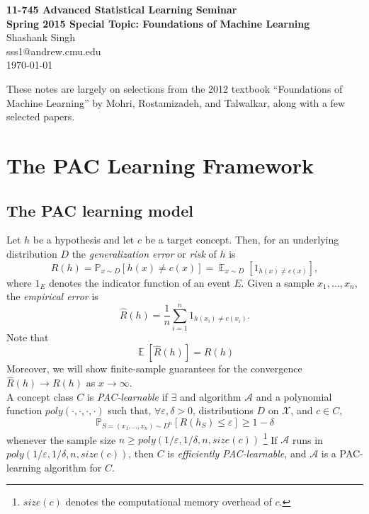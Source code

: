 \documentclass[10pt]{article}
\newcommand{\e}{\varepsilon}                        %
\newcommand{\X}{\mathcal{X}}                        %
\newcommand{\A}{\mathcal{A}}                        %
\newcommand{\E}{\mathop{\mathbb{E}}}                %
\newcommand{\pr}{\mathbb{P}}                        %
\renewcommand{\hat}{\widehat}
\begin{document}
\begin{center}
{\bf\Large 11-745 Advanced Statistical Learning Seminar\\
Spring 2015 Special Topic: Foundations of Machine Learning}\\
Shashank Singh\\
sss1@andrew.cmu.edu\\
\today\\
\end{center}



These notes are largely on selections from the 2012 textbook ``Foundations of
Machine Learning'' by Mohri, Rostamizadeh, and Talwalkar, along with a few
selected papers.\\

\section{The PAC Learning Framework}
\subsection{The PAC learning model}
Let $h$ be a hypothesis and let $c$ be a target concept. Then, for an
underlying distribution $D$ the \emph{generalization error} or \emph{risk} of
$h$ is
\[R(h)
    = \pr_{x \sim D}\left[ h(x) \neq c(x) \right]
    = \E_{x \sim D}\left[ 1_{h(x) \neq c(x)} \right],\]
where $1_E$ denotes the indicator function of an event $E$.
Given a sample $x_1,\dots,x_n$, the \emph{empirical error} is
\[\hat R(h) = \frac1n \sum_{i = 1}^n 1_{h(x_i) \neq c(x_i)}.\]
Note that
\begin{equation}
\E[\hat R(h)] = R(h)
\label{eq:exp_emp_risk}
\end{equation}
Moreover, we will show finite-sample guarantees for the convergence
$\hat R(h) \to R(h)$ as $x \to \infty$. \\

A concept class $C$ is \emph{PAC-learnable} if $\exists$ and algorithm $\A$ and
a polynomial function $poly(\cdot,\cdot,\cdot,\cdot)$ such that,
$\forall \e, \delta > 0$, distributions $D$ on $\X$, and $c \in C$,
\[\pr_{S = (x_1,\dots,x_n) \sim D^n}\left[ R(h_S) \leq \e \right]
    \geq 1 - \delta\]
whenever the sample size $n \geq poly(1/\e,1/\delta,n,size(c))$
\footnote{$size(c)$ denotes the computational memory overhead of $c$.}
If $\A$ runs in $poly(1/\e,1/\delta,n,size(c))$, then $C$ is \emph{efficiently
PAC-learnable}, and $\A$ is a PAC-learning algorithm for $C$. \\
\end{document}
